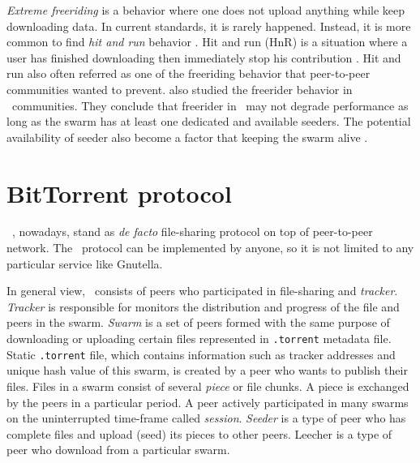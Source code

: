 \textit{Extreme freeriding} is a behavior where one does not upload anything while keep downloading data. In current standards, it is rarely happened. Instead, it is more common to find \textit{hit and run} behavior \cite{2011:managesupplydemand:meulpolder}. Hit and run (HnR) is a situation where a user has finished downloading then immediately stop his contribution \cite{2014:sustainabilitytorrent:chen}. Hit and run also often referred as one of the freeriding behavior that peer-to-peer communities wanted to prevent. \citeauthor{2015:freeriderinbtcommunity:das} also studied the freerider behavior in \bt~communities. They conclude that freerider in \bt~may not degrade performance as long as the swarm has at least one dedicated and available seeders. The potential availability of seeder also become a factor that keeping the swarm alive \cite{2015:freeriderinbtcommunity:das}. 

\section{BitTorrent protocol}
\bt~\cite{2003:bittorrent:cohen}, nowadays, stand as \textit{de facto} file-sharing protocol on top of peer-to-peer network. The \bt~protocol can be implemented by anyone, so it is not limited to any particular service like Gnutella.

In general view, \bt~consists of peers who participated in file-sharing and \textit{tracker}. \textit{Tracker} is responsible for monitors the distribution and progress of the file and peers in the swarm. \textit{Swarm} is a set of peers formed with the same purpose of downloading or uploading certain files represented in \texttt{.torrent} metadata file. Static \texttt{.torrent} file, which contains information such as tracker addresses and unique hash value of this swarm, is created by a peer who wants to publish their files. Files in a swarm consist of several \textit{piece} or file chunks. A piece is exchanged by the peers in a particular period. A peer actively participated in many swarms on the uninterrupted time-frame called \textit{session}. \textit{Seeder} is a type of peer who has complete files and upload (seed) its pieces to other peers. Leecher is a type of peer who download from a particular swarm.

